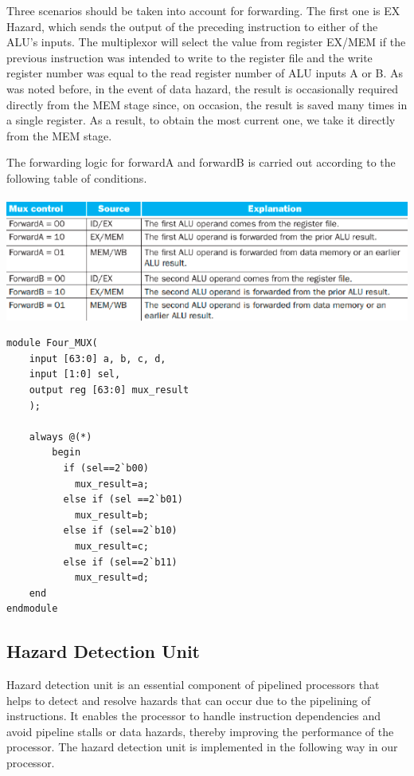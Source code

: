 \documentclass{article}
\begin{document}
Three scenarios should be taken into account for forwarding. The first one is EX Hazard, which sends the output of the preceding instruction to either of the ALU's inputs. The multiplexor will select the value from register EX/MEM if the previous instruction was intended to write to the register file and the write register number was equal to the read register number of ALU inputs A or B. As was noted before, in the event of data hazard, the result is occasionally required directly from the MEM stage since, on occasion, the result is saved many times in a single register. As a result, to obtain the most current one, we take it directly from the MEM stage.

The forwarding logic for forwardA and forwardB is carried out according to the following table of conditions.
\\ \\
\includegraphics*[width = 12.5 cm]{forwardingconditions.png}

\begin{lstlisting}[caption={Four MUX}, captionpos=b, language=RISC-V]
module Four_MUX(
    input [63:0] a, b, c, d, 
    input [1:0] sel, 
    output reg [63:0] mux_result
    );
    
    always @(*)
        begin
          if (sel==2`b00)
            mux_result=a;
          else if (sel ==2`b01)
            mux_result=b;
          else if (sel==2`b10)
            mux_result=c;
          else if (sel==2`b11)
            mux_result=d;    
    end 
endmodule
\end{lstlisting}
    
\subsection{Hazard Detection Unit}
Hazard detection unit is an essential component of pipelined processors that helps to detect and resolve hazards that can occur due to the pipelining of instructions. It enables the processor to handle instruction dependencies and avoid pipeline stalls or data hazards, thereby improving the performance of the processor. The hazard detection unit is implemented in the following way in our processor.
\end{document}
